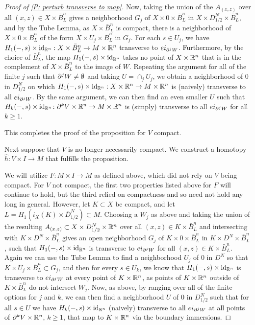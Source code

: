 \begin{proof}[Proof of \cref{P: perturb transverse to map}]
	Now, taking the union of the $A_{(x,z)}$ over all $(x,z) \in X \times \bar B^n_L$ gives a neighborhood $G_j$ of $X \times 0 \times \bar B^n_L$ in $X \times D_{1/2}^N \times \bar B^n_L$, and by the Tube Lemma, as $X \times \bar B^n_L$ is compact, there is a neighborhood of $X \times 0 \times \bar B^n_L$ of the form $X \times U_j \times \bar B^n_L$ in $G_j$.
	For each $s \in U_j$, we have $H_1(-,s) \times \mathrm{id}_{\mathbb{R}^n}:X \times \bar B^n_L \to M \times \mathbb{R}^n$ transverse to $ei_{\partial^jW}$.
	Furthermore, by the choice of $\bar B^n_L$, the map $H_1(-,s) \times \mathrm{id}_{\mathbb{R}^n}$ takes no point of $X \times \mathbb{R}^n$ that is in the complement of $X \times \bar B^n_L$ to the image of $W$.
	Repeating the argument for all of the finite $j$ such that $\partial^jW\neq \emptyset$ and taking $U = \cap_j U_j$, we obtain a neighborhood of $0$ in $D_{1/2}^N$ on which $H_1(-,s) \times \mathrm{id}_{\mathbb{R}^n}:X \times \mathbb{R}^n \to M \times \mathbb{R}^n$ is (naively) transverse to all $ei_{\partial^jW}$.
	By the same argument, we can then find an even smaller $U$ such that $H_k(-,s) \times \mathrm{id}_{\mathbb{R}^n} \colon \partial^{k}V \times \mathbb{R}^n \to M \times \mathbb{R}^n$ is (simply) transverse to all $ei_{\partial^jW}$ for all $k\geq 1$.

	This completes the proof of the proposition for $V$ compact.

	Next suppose that $V$ is no longer necessarily compact.
	We construct a homotopy $\hat h \colon V \times I \to M$ that fulfills the proposition.

	We will utilize $F \colon M \times I \to M$ as defined above, which did not rely on $V$ being compact.
	For $V$ not compact, the first two properties listed above for $F$ will continue to hold, but the third relied on compactness and so need not hold any long in general.
	However, let $K \subset X$ be compact, and let $L = H_1(i_X(K) \times \bar D_{1/2}^N) \subset M$.
	Choosing a $W_j$ as above and taking the union of the resulting $A_{(x,z)} \subset X \times D_{1/2}^N \times \mathbb{R}^n$ over all $(x,z) \in K \times \bar B^n_L$ and intersecting with $K \times D^N \times \bar B^n_L$ gives an open neighborhood $G_j$ of $K \times 0 \times \bar B^n_L$ in $K \times D^N \times \bar B^n_L$, such that
	$H_1(-,s) \times \mathrm{id}_{\mathbb{R}^n}$ is transverse to $ei_{\partial^jW}$ for all $(x,z) \in K \times \bar B^n_L$.
	Again we can use the Tube Lemma to find a neighborhood $U_j$ of $0$ in $D^N$ so that $K \times U_j \times \bar B^n_L \subset G_j$, and then for every $s \in U_k$, we know that $H_1(-,s) \times \mathrm{id}_{\mathbb{R}^n}$ is transverse to $ei_{\partial^jW}$ at every point of $K \times \mathbb{R}^n$, as points of $K \times \mathbb{R}^n$ outside of $K \times \bar B^n_L$ do not intersect $W_j$.
	Now, as above, by ranging over all of the finite options for $j$ and $k$, we can then find a neighborhood $U$ of $0$ in $D^N_{1/2}$ such that for all $s \in U$ we have $H_k(-,s) \times \mathrm{id}_{\mathbb{R}^n}$ (naively) transverse to all $ei_{\partial^jW}$ at all points of $\partial^kV \times \mathbb{R}^n$, $k\geq 1$, that map to $K \times \mathbb{R}^n$ via the boundary immersions.


\end{proof}
